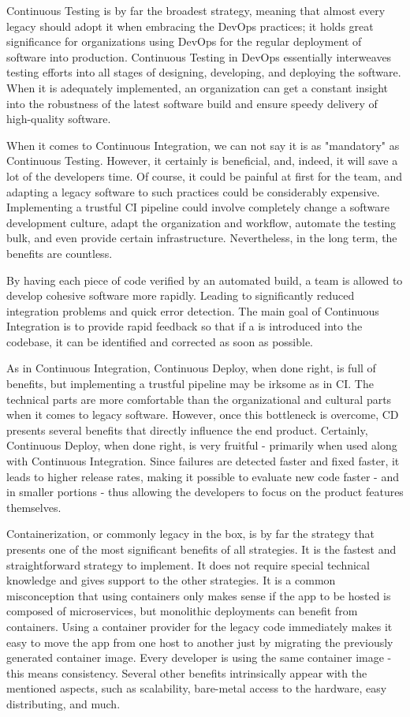 Continuous Testing is by far the broadest strategy, meaning that almost every
legacy should adopt it when embracing the DevOps practices; it holds great
significance for organizations using DevOps for the regular deployment of
software into production. Continuous Testing in DevOps essentially interweaves
testing efforts into all stages of designing, developing, and deploying the
software. When it is adequately implemented, an organization can get a constant
insight into the robustness of the latest software build and ensure speedy
delivery of high-quality software.

When it comes to Continuous Integration, we can not say it is as "mandatory" as
Continuous Testing. However, it certainly is beneficial, and, indeed, it will
save a lot of the developers time. Of course, it could be painful at first for
the team, and adapting a legacy software to such practices could be considerably
expensive. Implementing a trustful CI pipeline could involve completely change a
software development culture, adapt the organization and workflow, automate the
testing bulk, and even provide certain infrastructure. Nevertheless, in the long
term, the benefits are countless.

By having each piece of code verified by an automated build, a team is allowed
to develop cohesive software more rapidly. Leading to significantly reduced
integration problems and quick error detection. The main goal of Continuous
Integration is to provide rapid feedback so that if a  is introduced
into the codebase, it can be identified and corrected as soon as possible.

As in Continuous Integration, Continuous Deploy, when done right, is full of
benefits, but implementing a trustful pipeline may be irksome as in CI. The
technical parts are more comfortable than the organizational and cultural parts
when it comes to legacy software. However, once this bottleneck is overcome, CD
presents several benefits that directly influence the end product. Certainly,
Continuous Deploy, when done right, is very fruitful - primarily when used along
with Continuous Integration. Since failures are detected faster and fixed
faster, it leads to higher release rates, making it possible to evaluate new
code faster - and in smaller portions - thus allowing the developers to focus on
the product features themselves.

Containerization, or commonly legacy in the box, is by far the strategy that
presents one of the most significant benefits of all strategies. It is the
fastest and straightforward strategy to implement. It does not require special
technical knowledge and gives support to the other strategies. It is a common
misconception that using containers only makes sense if the app to be hosted is
composed of microservices, but monolithic deployments can benefit from
containers. Using a container provider for the legacy code immediately makes it
easy to move the app from one host to another just by migrating the previously
generated container image. Every developer is using the same container image -
this means consistency. Several other benefits intrinsically appear with the
mentioned aspects, such as scalability, bare-metal access to the hardware, easy
distributing, and much.

